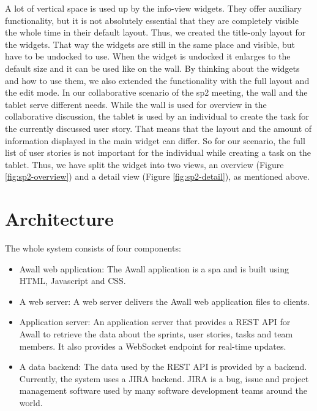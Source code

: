 \documentclass{sigchi}
\begin{document}
A lot of vertical space is used up by the info-view widgets.
They offer auxiliary functionality, but it is not absolutely essential that they are completely visible the whole time in their default layout.
Thus, we created the title-only layout for the widgets.
That way the widgets are still in the same place and visible, but have to be undocked to use.
When the widget is undocked it enlarges to the default size and it can be used like on the wall.
By thinking about the widgets and how to use them, we also extended the functionality with the full layout and the edit mode.
In our collaborative scenario of the \gls{sp2} meeting, the wall and the tablet serve different needs.
While the wall is used for overview in the collaborative discussion, the tablet is used by an individual to create the task for the currently discussed user story.
That means that the layout and the amount of information displayed in the main widget can differ.
So for our scenario, the full list of user stories is not important for the individual while creating a task on the tablet.
Thus, we have split the widget into two views, an overview (Figure \ref{fig:sp2-overview}) and a detail view (Figure \ref{fig:sp2-detail}), as mentioned above.

\section{Architecture}

The whole system consists of four components:
\begin{itemize}
	\item Awall web application: The Awall application is a \gls{spa} and is built using HTML, Javascript and CSS.
	\item A web server: A web server delivers the Awall web application files to clients.
	\item Application server: An application server that provides a REST API for Awall to retrieve the data about the sprints, user stories, tasks and team members.
	It also provides a WebSocket endpoint for real-time updates.
	\item A data backend: The data used by the REST API is provided by a backend. 
	Currently, the system uses a JIRA backend. JIRA is a bug, issue and project management software used by many software development teams around the world.
\end{itemize}
\end{document}
